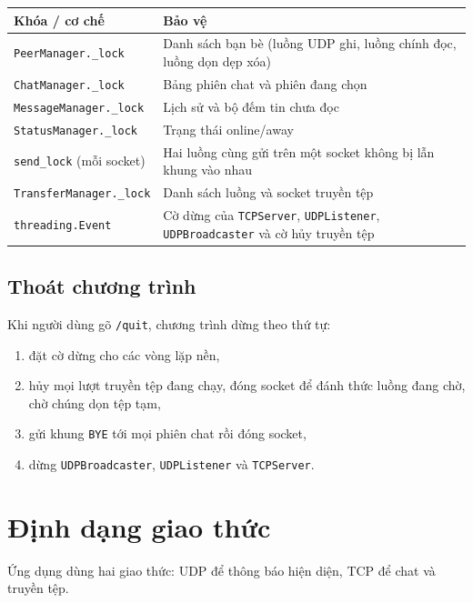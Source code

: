 \documentclass[a4paper,12pt]{article}
\newcommand{\code}[1]{\texttt{#1}}
\begin{document}
\begin{center}
\begin{tabularx}{\textwidth}{@{}l X@{}}
\toprule
\textbf{Khóa / cơ chế} & \textbf{Bảo vệ} \\
\midrule
\code{PeerManager.\_lock} & Danh sách bạn bè (luồng UDP ghi, luồng chính đọc, luồng dọn dẹp xóa) \\
\code{ChatManager.\_lock} & Bảng phiên chat và phiên đang chọn \\
\code{MessageManager.\_lock} & Lịch sử và bộ đếm tin chưa đọc \\
\code{StatusManager.\_lock} & Trạng thái online/away \\
\code{send\_lock} (mỗi socket) & Hai luồng cùng gửi trên một socket không bị lẫn khung vào nhau \\
\code{TransferManager.\_lock} & Danh sách luồng và socket truyền tệp \\
\code{threading.Event} & Cờ dừng của \code{TCPServer}, \code{UDPListener}, \code{UDPBroadcaster} và cờ hủy truyền tệp \\
\bottomrule
\end{tabularx}
\end{center}

\subsection{Thoát chương trình}
Khi người dùng gõ \code{/quit}, chương trình dừng theo thứ tự:
\begin{enumerate}
\item đặt cờ dừng cho các vòng lặp nền,
\item hủy mọi lượt truyền tệp đang chạy, đóng socket để đánh thức luồng đang chờ, chờ chúng dọn tệp tạm,
\item gửi khung \code{BYE} tới mọi phiên chat rồi đóng socket,
\item dừng \code{UDPBroadcaster}, \code{UDPListener} và \code{TCPServer}.
\end{enumerate}

\section{Định dạng giao thức}
Ứng dụng dùng hai giao thức: UDP để thông báo hiện diện, TCP để chat và truyền tệp.
\end{document}
